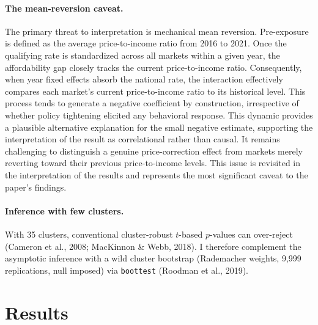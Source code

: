 \documentclass[12pt]{article}
\begin{document}
\paragraph{The mean-reversion caveat.} The primary threat to interpretation is mechanical mean reversion. Pre-exposure is defined as the average price-to-income ratio from 2016 to 2021. Once the qualifying rate is standardized across all markets within a given year, the affordability gap closely tracks the current price-to-income ratio. Consequently, when year fixed effects absorb the national rate, the interaction effectively compares each market's current price-to-income ratio to its historical level. This process tends to generate a negative coefficient by construction, irrespective of whether policy tightening elicited any behavioral response. This dynamic provides a plausible alternative explanation for the small negative estimate, supporting the interpretation of the result as correlational rather than causal. It remains challenging to distinguish a genuine price-correction effect from markets merely reverting toward their previous price-to-income levels. This issue is revisited in the interpretation of the results and represents the most significant caveat to the paper's findings.

\paragraph{Inference with few clusters.} With 35 clusters, conventional cluster-robust $t$-based $p$-values can over-reject (Cameron et al., 2008; MacKinnon \& Webb, 2018). I therefore complement the asymptotic inference with a wild cluster bootstrap (Rademacher weights, 9{,}999 replications, null imposed) via \texttt{boottest} (Roodman et al., 2019).


\section{Results}
\label{sec:results}
\end{document}
